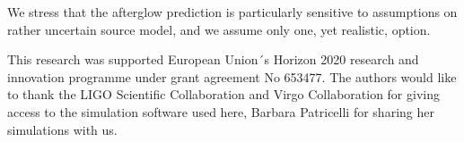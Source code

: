 \documentclass[11pt]{article}
\begin{document}
We stress that the afterglow prediction is particularly sensitive to
assumptions on rather uncertain source model, and we assume only
one, yet realistic, option.

\vspace{10mm}


{\linespread{0.1} \footnotesize This research was supported European Union´s Horizon 2020 research and
  innovation programme under grant agreement No 653477. The authors would like
  to thank the LIGO Scientific Collaboration and Virgo Collaboration for giving
  access to the simulation software used here, Barbara Patricelli for sharing
  her simulations with us.}


{\footnotesize
}
\end{document}
